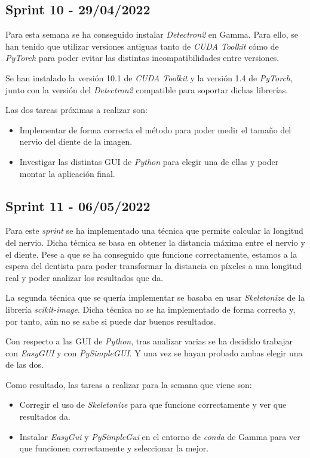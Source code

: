 \subsection{Sprint 10 - 29/04/2022}
Para esta semana se ha conseguido instalar \emph{Detectron2} en Gamma. Para ello, se han tenido que utilizar versiones antiguas tanto de \emph{CUDA Toolkit} cómo de  \emph{PyTorch} para poder evitar las distintas incompatibilidades entre versiones.

Se han instalado la versión 10.1 de \emph{CUDA Toolkit} y la versión 1.4 de \emph{PyTorch}, junto con la versión del \emph{Detectron2} compatible para soportar dichas librerías.

Las dos tareas próximas a realizar son:
\begin{itemize}
    \item Implementar de forma correcta el método para poder medir el tamaño del nervio del diente de la imagen.
    \item Investigar las distintas GUI de \emph{Python} para elegir una de ellas y poder montar la aplicación final.  
\end{itemize}

\subsection{Sprint 11 - 06/05/2022}
Para este \emph{sprint} se ha implementado una técnica que permite calcular la longitud del nervio. Dicha técnica se basa en obtener la distancia máxima entre el nervio y el diente. Pese a que se ha conseguido que funcione correctamente, estamos a la espera del dentista para poder transformar la distancia en píxeles a una longitud real y poder analizar los resultados que da.

La segunda técnica que se quería implementar se basaba en usar \emph{Skeletonize} de la librería \emph{scikit-image}. Dicha técnica no se ha implementado de forma correcta y, por tanto, aún no se sabe si puede dar buenos resultados.

Con respecto a las GUI de \emph{Python}, tras analizar varias se ha decidido trabajar con \emph{EasyGUI} y con \emph{PySimpleGUI}. Y una vez se hayan probado ambas elegir una de las dos.

Como resultado, las tareas a realizar para la semana que viene son:
\begin{itemize}
    \item Corregir el uso de \emph{Skeletonize} para que funcione correctamente y ver que resultados da.
    \item Instalar \emph{EasyGui} y \emph{PySimpleGui} en el entorno de \emph{conda} de Gamma para ver que funcionen correctamente y seleccionar la mejor.
\end{itemize}


